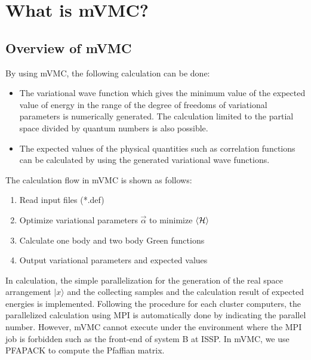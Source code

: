 \chapter{What is mVMC?}
\label{Ch:whatismVMC}
\section{Overview of mVMC}
By using mVMC, the following calculation can be done:
\begin{itemize}
\item{The variational wave function which gives the minimum value of the expected value of energy in the range of the degree of freedoms of variational parameters is numerically generated. The calculation limited to the partial space divided by quantum numbers is also possible. }
\item{The expected values of the physical quantities such as correlation functions can be calculated by using the generated variational wave functions.}
\end{itemize}

The calculation flow in mVMC is shown as follows:
\begin{enumerate}
\item{Read input files (*.def)}
\item{Optimize variational parameters $\vec{\alpha}$ to minimize $\langle {\cal H} \rangle$}
\item{Calculate one body and two body Green functions}
\item{Output variational parameters and expected values}
\end{enumerate}
In calculation, the simple parallelization for the generation of the real space arrangement $|x\rangle$ and the collecting samples and the calculation result of expected energies is implemented. Following the procedure for each cluster computers, the parallelized calculation using MPI is automatically done by indicating the parallel number. However, mVMC cannot execute under the environment where the MPI job is forbidden such as the front-end of system B at ISSP. In mVMC, we use PFAPACK\cite{PFAPACK} to compute the Pfaffian matrix.

